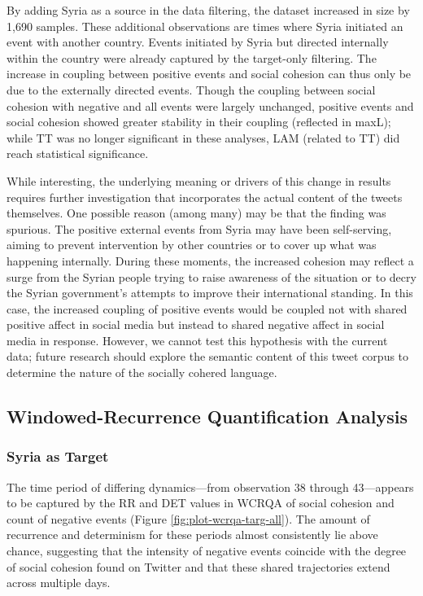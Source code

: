 \documentclass[english,man]{apa6}
\begin{document}
By adding Syria as a source in the data filtering, the dataset increased
in size by 1,690 samples. These additional observations are times where
Syria initiated an event with another country. Events initiated by Syria
but directed internally within the country were already captured by the
target-only filtering. The increase in coupling between positive events
and social cohesion can thus only be due to the externally
directed events. Though the coupling between social cohesion with
negative and all events were largely unchanged,
positive events and social cohesion showed greater stability
in their coupling (reflected in maxL); while TT was no longer
significant in these analyses, LAM (related to TT) did
reach statistical significance.

While interesting, the underlying meaning or drivers of this change
in results requires further investigation that incorporates the
actual content of the tweets themselves. One possible reason (among
many) may be that the finding was spurious. The positive external
events from Syria may have been self-serving, aiming to prevent intervention
by other countries or to cover up what was happening internally.
During these moments, the increased cohesion may reflect a surge from
the Syrian people trying to raise awareness of the situation or
to decry the Syrian government's attempts to improve their international
standing. In this case, the increased coupling of positive events would
be coupled not with shared positive affect in social media but instead
to shared negative affect in social media in response. However, we
cannot test this hypothesis with the current data; future
research should explore the semantic content of this tweet
corpus to determine the nature of the socially cohered language.

\hypertarget{windowed-recurrence-quantification-analysis}{%
\subsection{Windowed-Recurrence Quantification Analysis}\label{windowed-recurrence-quantification-analysis}}

\hypertarget{syria-as-target-3}{%
\subsubsection{Syria as Target}\label{syria-as-target-3}}

The time period of differing dynamics---from observation 38 through
43---appears to be captured by the RR and DET values in
WCRQA of social cohesion and count of negative
events (Figure \ref{fig:plot-wcrqa-targ-all}). The
amount of recurrence and determinism for these periods almost consistently
lie above chance, suggesting that the intensity of negative events coincide
with the degree of social cohesion found on Twitter and that these
shared trajectories extend across multiple days.
\end{document}
